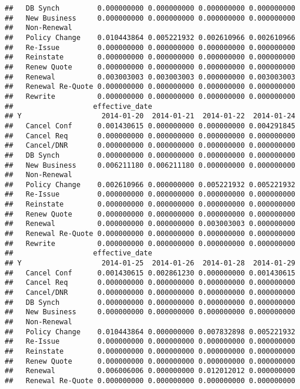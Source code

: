 \documentclass[]{article}
\begin{document}
\begin{verbatim}
##   DB Synch         0.000000000 0.000000000 0.000000000 0.000000000
##   New Business     0.000000000 0.000000000 0.000000000 0.000000000
##   Non-Renewal                                                     
##   Policy Change    0.010443864 0.005221932 0.002610966 0.002610966
##   Re-Issue         0.000000000 0.000000000 0.000000000 0.000000000
##   Reinstate        0.000000000 0.000000000 0.000000000 0.000000000
##   Renew Quote      0.000000000 0.000000000 0.000000000 0.000000000
##   Renewal          0.003003003 0.003003003 0.000000000 0.003003003
##   Renewal Re-Quote 0.000000000 0.000000000 0.000000000 0.000000000
##   Rewrite          0.000000000 0.000000000 0.000000000 0.000000000
##                   effective_date
## Y                   2014-01-20  2014-01-21  2014-01-22  2014-01-24
##   Cancel Conf      0.001430615 0.000000000 0.000000000 0.004291845
##   Cancel Req       0.000000000 0.000000000 0.000000000 0.000000000
##   Cancel/DNR       0.000000000 0.000000000 0.000000000 0.000000000
##   DB Synch         0.000000000 0.000000000 0.000000000 0.000000000
##   New Business     0.006211180 0.006211180 0.000000000 0.000000000
##   Non-Renewal                                                     
##   Policy Change    0.002610966 0.000000000 0.005221932 0.005221932
##   Re-Issue         0.000000000 0.000000000 0.000000000 0.000000000
##   Reinstate        0.000000000 0.000000000 0.000000000 0.000000000
##   Renew Quote      0.000000000 0.000000000 0.000000000 0.000000000
##   Renewal          0.000000000 0.000000000 0.003003003 0.000000000
##   Renewal Re-Quote 0.000000000 0.000000000 0.000000000 0.000000000
##   Rewrite          0.000000000 0.000000000 0.000000000 0.000000000
##                   effective_date
## Y                   2014-01-25  2014-01-26  2014-01-28  2014-01-29
##   Cancel Conf      0.001430615 0.002861230 0.000000000 0.001430615
##   Cancel Req       0.000000000 0.000000000 0.000000000 0.000000000
##   Cancel/DNR       0.000000000 0.000000000 0.000000000 0.000000000
##   DB Synch         0.000000000 0.000000000 0.000000000 0.000000000
##   New Business     0.000000000 0.000000000 0.000000000 0.000000000
##   Non-Renewal                                                     
##   Policy Change    0.010443864 0.000000000 0.007832898 0.005221932
##   Re-Issue         0.000000000 0.000000000 0.000000000 0.000000000
##   Reinstate        0.000000000 0.000000000 0.000000000 0.000000000
##   Renew Quote      0.000000000 0.000000000 0.000000000 0.000000000
##   Renewal          0.006006006 0.000000000 0.012012012 0.000000000
##   Renewal Re-Quote 0.000000000 0.000000000 0.000000000 0.000000000

\end{verbatim}
\end{document}

